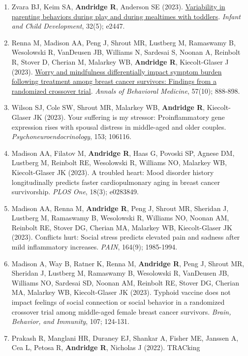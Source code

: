 \documentclass[
  english,
  letterpaper,
  DIV=11,
  numbers=noendperiod]{scrartcl}
\begin{document}
\begin{enumerate}
\item
  Zvara BJ, Keim SA, \textbf{Andridge R}, Anderson SE (2023).
  \href{https://doi.org/10.1002/icd.2447}{Variability in parenting
  behaviors during play and during mealtimes with toddlers}.
  \emph{Infant and Child Development}, 32(5); e2447.
\item
  Renna M, Madison AA, Peng J, Shrout MR, Lustberg M, Ramaswamy B,
  Wesolowski R, VanDeusen JB, Williams N, Sardesai S, Noonan A, Reinbolt
  R, Stover D, Cherian M, Malarkey WB, \textbf{Andridge R},
  Kiecolt-Glaser J (2023).
  \href{https://pubmed.ncbi.nlm.nih.gov/37335884/}{Worry and mindfulness
  differentially impact symptom burden following treatment among breast
  cancer survivors: Findings from a randomized crossover trial}.
  \emph{Annals of Behavioral Medicine}, 57(10); 888-898.
\item
  Wilson SJ, Cole SW, Shrout MR, Malarkey WB, \textbf{Andridge R},
  Kiecolt-Glaser JK (2023). Your suffering is my stressor:
  Proinflammatory gene expression rises with spousal distress in
  middle-aged and older couples. \emph{Psychoneuroendocrinology}, 153;
  106116.
\item
  Madison AA, Filatov M, \textbf{Andridge R}, Haas G, Povoski SP, Agnese
  DM, Lustberg M, Reinbolt RE, Wesolowski R, Williams NO, Malarkey WB,
  Kiecolt-Glaser JK (2023). A troubled heart: Mood disorder history
  longitudinally predicts faster cardiopulmonary aging in breast cancer
  survivorship. \emph{PLOS One}, 18(3); e0283849.
\item
  Madison AA, Renna M, \textbf{Andridge R}, Peng J, Shrout MR, Sheridan
  J, Lustberg M, Ramaswamy B, Wesolowski R, Williams NO, Noonan AM,
  Reinbolt RE, Stover DG, Cherian MA, Malarkey WB, Kiecolt-Glaser JK
  (2023). Conflicts hurt: Social stress predicts elevated pain and
  sadness after mild inflammatory increases. \emph{PAIN}, 164(9);
  1985-1994.
\item
  Madison A, Way B, Ratner K, Renna M, \textbf{Andridge R}, Peng J,
  Shrout MR, Sheridan J, Lustberg M, Ramaswamy B, Wesolowski R,
  VanDeusen JB, Williams NO, Sardesai SD, Noonan AM, Reinbolt RE, Stover
  DG, Cherian MA, Malarkey WB, Kiecolt-Glaser JK (2023). Typhoid vaccine
  does not impact feelings of social connection or social behavior in a
  randomized crossover trial among middle-aged female breast cancer
  survivors. \emph{Brain, Behavior, and Immunity}, 107; 124-131.
\item
  Prakash R, Manglani HR, Duraney EJ, Shankar A, Fisher ME, Janssen A,
  Cea L, Petosa R, \textbf{Andridge R}, Nicholas J (2022). TRACking

\end{enumerate}
\end{document}
